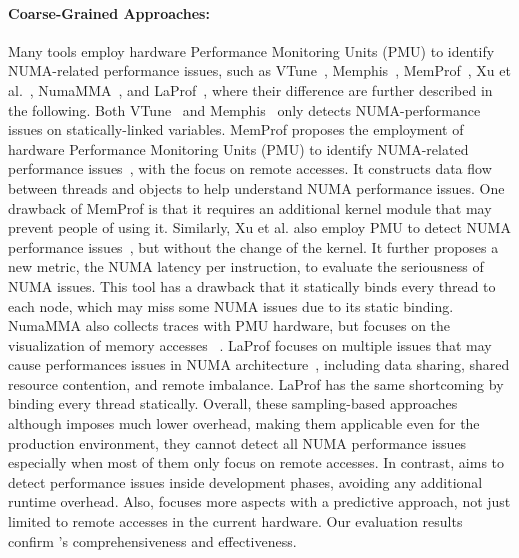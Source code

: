 \paragraph{Coarse-Grained Approaches:}
Many tools employ hardware Performance Monitoring Units (PMU) to identify NUMA-related performance issues, such as VTune~\cite{Intel:VTune}, Memphis~\cite{Memphis}, MemProf~\cite{Lachaize:2012:MMP:2342821.2342826}, Xu et al.~\cite{XuNuma}, NumaMMA~\cite{NumaMMA}, and LaProf~\cite{7847070}, where their difference are further described in the following. 
Both VTune~\cite{Intel:VTune} and Memphis~\cite{Memphis} only detects NUMA-performance issues on statically-linked variables.  
MemProf proposes the employment of hardware Performance Monitoring Units (PMU) to identify NUMA-related performance issues~\cite{Lachaize:2012:MMP:2342821.2342826}, with the focus on remote accesses. It constructs data flow between threads and objects to help understand NUMA performance issues. One drawback of MemProf is that it requires an additional kernel module that may prevent people of using it. Similarly, Xu et al. also employ PMU to detect NUMA performance issues~\cite{XuNuma}, but without the change of the kernel. It further proposes a new metric, the NUMA latency per instruction, to evaluate the seriousness of NUMA issues. This tool has a drawback that it statically binds every thread to each node, which may miss some NUMA issues due to its static binding. 
NumaMMA also collects traces with PMU hardware, but focuses on the visualization of memory accesses ~\cite{NumaMMA}. LaProf focuses on multiple issues that may cause performances issues in NUMA architecture~\cite{7847070}, including data sharing, shared resource contention, and remote imbalance. LaProf has the same shortcoming by binding every thread statically.  Overall, these sampling-based approaches although imposes much lower overhead, making them applicable even for the production environment, they cannot detect all NUMA performance issues especially when most of them only focus on remote accesses. In contrast, \NP{} aims to detect performance issues inside  development phases, avoiding any additional runtime overhead. Also, \NP{} focuses more aspects with a predictive approach, not just limited to remote accesses in the current hardware. Our evaluation results confirm \NP{}'s comprehensiveness and effectiveness. 

